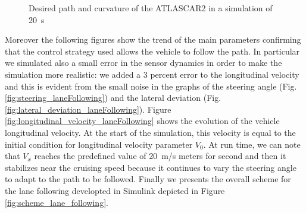 \documentclass[conference,11pt]{IEEEtran}
\begin{document}
\begin{figure}[!t]
\begin{minipage}[t]{\columnwidth}
		\vspace{-17pt}
		\subcaption{}
		\label{fig:curvature_laneFollowing}
	\end{minipage}
	\caption{Desired path and curvature of the ATLASCAR2 in a simulation of \SI{20}{s}}
	\label{fig:laneFollowing_desired}
	\vspace{-30pt}
\end{figure}

Moreover the following figures show the trend of the main parameters confirming that the control strategy used allows the vehicle to follow the path. In particular we simulated also a small error in the sensor dynamics in order to make the simulation more realistic: we added a 3 percent error to the longitudinal velocity and this is evident from the small noise in the graphs of the steering angle (Fig.\ref{fig:steering_laneFollowing}) and the lateral deviation (Fig.\ref{fig:lateral_deviation_laneFollowing}).
Figure {\ref{fig:longitudinal_velocity_laneFollowing}} shows the evolution of the vehicle longitudinal velocity. At the start of the simulation, this velocity is equal to the initial condition for longitudinal velocity parameter $V_0$. At run time, we can note that $V_x$ reaches the predefined value of \SI{20}{m/s} meters for second and then it stabilizes near the cruising speed because it continues to vary the steering angle to adapt to the path to be followed. Finally we presents the overall scheme for the lane following developted in Simulink depicted in Figure \ref{fig:scheme_lane_following}.
\end{document}
